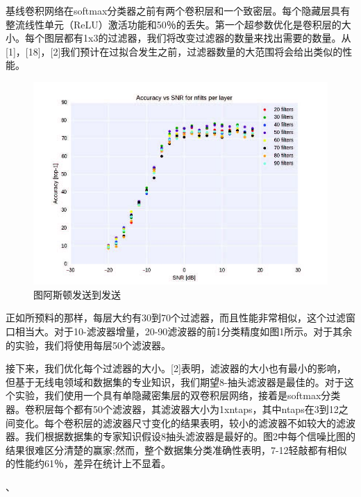 基线卷积网络在softmax分类器之前有两个卷积层和一个致密层。每个隐藏层具有整流线性单元（ReLU）激活功能和50％的丢失。第一个超参数优化是卷积层的大小。每个图层都有1x3的过滤器，我们将改变过滤器的数量来找出需要的数量。从[1]，[18]，[2]我们预计在过拟合发生之前，过滤器数量的大范围将会给出类似的性能。\par
\begin{figure}[!h]
	\centering
	\includegraphics[scale=1]{figures/chapter_5/fig1}
	\caption{图阿斯顿发送到发送}\label{fig_5_1}
\end{figure}
正如所预料的那样，每层大约有30到70个过滤器，而且性能非常相似，这个过滤窗口相当大。对于10-滤波器增量，20-90滤波器的前1分类精度如图1所示。对于其余的实验，我们将使用每层50个滤波器。\par

接下来，我们优化每个过滤器的大小。[2]表明，滤波器的大小也有最小的影响，但基于无线电领域和数据集的专业知识，我们期望8-抽头滤波器是最佳的。对于这个实验，我们使用一个具有单隐藏密集层的双卷积层网络，接着是softmax分类器。卷积层每个都有50个滤波器，其滤波器大小为1xntaps，其中ntaps在3到12之间变化。每个卷积层的滤波器尺寸变化的结果表明，较小的滤波器不如较大的滤波器。我们根据数据集的专家知识假设8抽头滤波器是最好的。图2中每个信噪比图的结果很难区分清楚的赢家;然而，整个数据集分类准确性表明，7-12轻敲都有相似的性能约61％，差异在统计上不显着。\par、

